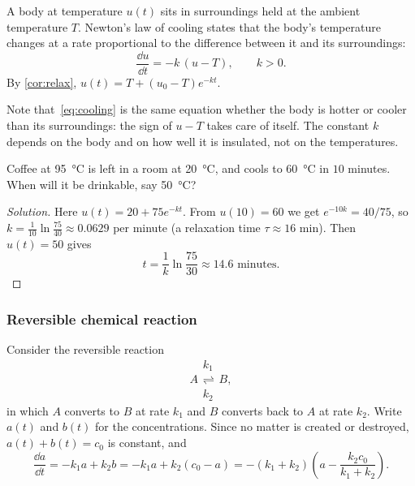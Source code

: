 \begin{eg}
	A body at temperature \(u(t)\) sits in surroundings held at the ambient temperature
	\(T\). Newton's law of cooling states that the body's temperature changes at a rate
	proportional to the difference between it and its surroundings:
	\begin{equation}\label{eq:cooling}
		\frac{\dd u}{\dd t} = -k\,( u - T ), \qquad k > 0.
	\end{equation}
	By \autoref{cor:relax}, \(u(t) = T + (u_0 - T) e^{-kt}\).
\end{eg}

\begin{remark}
	Note that~\eqref{eq:cooling} is the same equation whether the body is hotter or cooler
	than its surroundings: the sign of \(u - T\) takes care of itself. The constant \(k\)
	depends on the body and on how well it is insulated, not on the temperatures.
\end{remark}

\begin{eg}
	Coffee at \SI{95}{\celsius} is left in a room at \SI{20}{\celsius}, and cools to
	\SI{60}{\celsius} in \(10\) minutes. When will it be drinkable, say
	\SI{50}{\celsius}?
\end{eg}

\begin{proof}[Solution]
	Here \(u(t) = 20 + 75 e^{-kt}\). From \(u(10) = 60\) we get
	\(e^{-10k} = 40/75\), so \(k = \frac{1}{10}\ln\frac{75}{40} \approx 0.0629\)
	per minute (a relaxation time \(\tau \approx 16\) min). Then \(u(t) = 50\) gives
	\[
		t = \frac{1}{k}\ln\frac{75}{30} \approx 14.6 \text{ minutes}.
	\]
\end{proof}

\subsubsection*{Reversible chemical reaction}

\begin{eg}
	Consider the reversible reaction
	\[
		A \mathrel{\substack{k_1 \\ \rightleftharpoons \\ k_2}} B,
	\]
	in which \(A\) converts to \(B\) at rate \(k_1\) and \(B\) converts back to \(A\) at
	rate \(k_2\). Write \(a(t)\) and \(b(t)\) for the concentrations. Since no matter is
	created or destroyed, \(a(t) + b(t) = c_0\) is constant, and
	\[
		\frac{\dd a}{\dd t} = -k_1 a + k_2 b = -k_1 a + k_2 (c_0 - a)
		= -(k_1 + k_2)\left( a - \frac{k_2 c_0}{k_1 + k_2} \right).
	\]
\end{eg}

